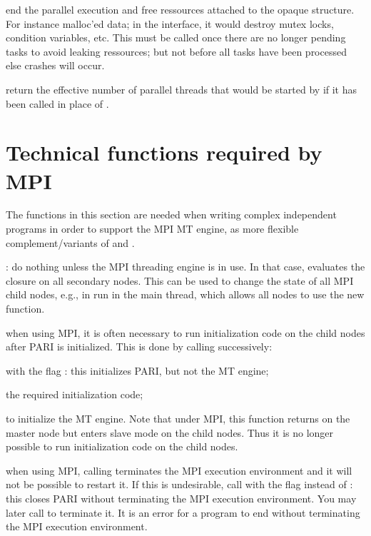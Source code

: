 { end the parallel execution
and free ressources attached to the opaque  structure. For
instance malloc'ed data; in the  interface, it would destroy
mutex locks, condition variables, etc. This must be called once there are no
longer pending tasks to avoid leaking ressources; but not before all tasks
have been processed else crashes will occur.

 return the effective number of parallel threads
that would be started by  if it has been called in place
of .

\section{Technical functions required by MPI}

The functions in this section are needed when writing complex independent
programs in order to support the MPI MT engine, as more flexible
complement/variants of  and .

: do nothing unless the MPI threading engine
is in use. In that case, evaluates the closure   on all secondary
nodes. This can be used to change the state of all MPI child nodes, e.g.,
in  run in the main thread, which allows all nodes to use the
new function.

when using MPI, it is often necessary to run initialization code on the child
nodes after PARI is initialized. This is done by calling successively:

\item {} with the flag :
this initializes PARI, but not the MT engine;

\item the required initialization code;

\item {} to initialize the MT engine.
Note that under MPI, this function returns on the master node but enters
slave mode on the child nodes. Thus it is no longer possible to run
initialization code on the child nodes.

when using MPI, calling  terminates the MPI execution
environment and it will not be possible to restart it. If this is
undesirable, call  with the flag 
instead of : this closes PARI without terminating the MPI
execution environment. You may later call  to terminate
it. It is an error for a program to end without terminating the MPI execution
environment.

}
